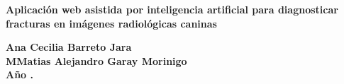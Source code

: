 \documentclass[12pt,a4paper,oneside]{book}
\begin{document}
\vspace{3 cm}
{
\noindent
\begin{center}
\huge \bf Aplicación web asistida por inteligencia artificial para diagnosticar fracturas en imágenes radiológicas caninas
\end{center}
}


\vspace{5 cm}

\begin{center}
{\textbf{\Large Ana Cecilia Barreto Jara}\\[5mm]
\textbf{\Large MMatias Alejandro Garay Morinigo}\\[5mm]
\vspace{1 cm}
\textbf{Año \the\year.}}
\end{center}









\cleardoublepage


\cleardoublepage

\tableofcontents

\cleardoublepage

\listoffigures
{}
\cleardoublepage

\listoftables
{}




{}
\printglossary[type=\acronymtype] %

\mainmatter
{} %








\backmatter

% 
\end{document}

